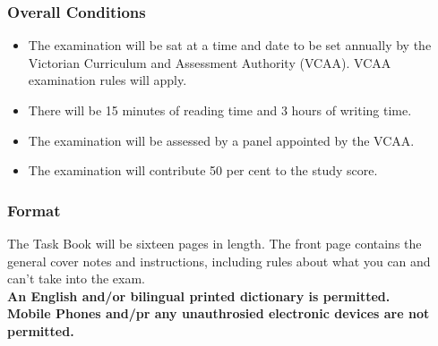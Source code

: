 \documentclass[a4paper]{article}
\begin{document}
\subsubsection{Overall Conditions}

\begin{itemize}
    \item The examination will be sat at a time and date to be set annually by the Victorian Curriculum and Assessment Authority (VCAA). VCAA examination rules will apply. 
    \item There will be 15 minutes of reading time and 3 hours of writing time.
\item The examination will be assessed by a panel appointed by the VCAA.
\item The examination will contribute 50 per cent to the study score.

\end{itemize}


\subsubsection{Format}
The Task Book will be sixteen pages in length. The front page contains the general cover notes and instructions, including rules about what you can and can’t take into the exam.\\

\textbf{An English and/or bilingual printed dictionary is permitted.}\\
\textbf{Mobile Phones and/pr any unauthrosied electronic devices are not permitted.}\\
\end{document}
